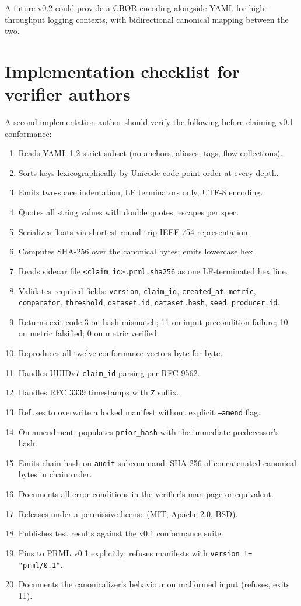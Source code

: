 \documentclass[11pt, a4paper]{article}
\begin{document}
A future v0.2 could provide a CBOR encoding alongside YAML for high-throughput logging contexts, with bidirectional canonical mapping between the two.

\section{Implementation checklist for verifier authors}
\label{app:checklist}

A second-implementation author should verify the following before claiming v0.1 conformance:

\begin{enumerate}[leftmargin=2em, itemsep=0.1em]
  \item Reads YAML 1.2 strict subset (no anchors, aliases, tags, flow collections).
  \item Sorts keys lexicographically by Unicode code-point order at every depth.
  \item Emits two-space indentation, LF terminators only, UTF-8 encoding.
  \item Quotes all string values with double quotes; escapes per spec.
  \item Serializes floats via shortest round-trip IEEE 754 representation.
  \item Computes SHA-256 over the canonical bytes; emits lowercase hex.
  \item Reads sidecar file \texttt{<claim\_id>.prml.sha256} as one LF-terminated hex line.
  \item Validates required fields: \texttt{version}, \texttt{claim\_id}, \texttt{created\_at}, \texttt{metric}, \texttt{comparator}, \texttt{threshold}, \texttt{dataset.id}, \texttt{dataset.hash}, \texttt{seed}, \texttt{producer.id}.
  \item Returns exit code 3 on hash mismatch; 11 on input-precondition failure; 10 on metric falsified; 0 on metric verified.
  \item Reproduces all twelve conformance vectors byte-for-byte.
  \item Handles UUIDv7 \texttt{claim\_id} parsing per RFC 9562.
  \item Handles RFC 3339 timestamps with \texttt{Z} suffix.
  \item Refuses to overwrite a locked manifest without explicit \texttt{--amend} flag.
  \item On amendment, populates \texttt{prior\_hash} with the immediate predecessor's hash.
  \item Emits chain hash on \texttt{audit} subcommand: SHA-256 of concatenated canonical bytes in chain order.
  \item Documents all error conditions in the verifier's man page or equivalent.
  \item Releases under a permissive license (MIT, Apache 2.0, BSD).
  \item Publishes test results against the v0.1 conformance suite.
  \item Pins to PRML v0.1 explicitly; refuses manifests with \texttt{version != "prml/0.1"}.
  \item Documents the canonicalizer's behaviour on malformed input (refuses, exits 11).
\end{enumerate}
\end{document}
